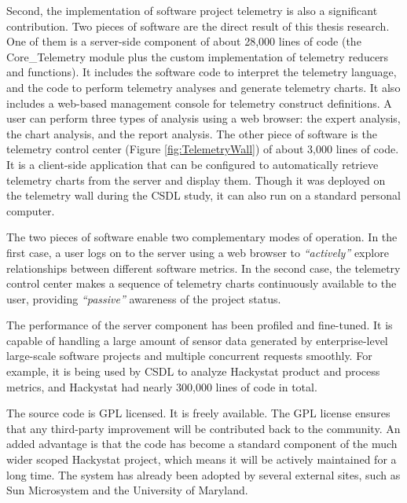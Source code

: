 Second, the implementation of software project telemetry is also a significant contribution. Two pieces of software are the direct result of this thesis research. 
One of them is a server-side component of about 28,000 lines of code (the Core\_Telemetry module plus the custom implementation of telemetry reducers and functions). It includes the software code to interpret the telemetry language, and the code to perform telemetry analyses and generate telemetry charts. It also includes a web-based management console for telemetry construct definitions. A user can perform three types of analysis using a web browser: the expert analysis, the chart analysis, and the report analysis.
The other piece of software is the telemetry control center (Figure \ref{fig:TelemetryWall}) of about 3,000 lines of code. It is a client-side application that can be configured to automatically retrieve telemetry charts from the server and display them. Though it was deployed on the telemetry wall during the CSDL study, it can also run on a standard personal computer.

The two pieces of software enable two complementary modes of operation. In the first case, a user logs on to the server using a web browser to \textit{``actively''} explore relationships between different software metrics. In the second case, the telemetry control center makes a sequence of telemetry charts continuously available to the user, providing \textit{``passive''} awareness of the project status.

The performance of the server component has been profiled and fine-tuned. It is capable of handling a large amount of sensor data generated by enterprise-level large-scale software projects and multiple concurrent requests smoothly. For example, it is being used by CSDL to analyze Hackystat product and process metrics, and Hackystat had nearly 300,000 lines of code in total.

The source code is GPL licensed. It is freely available. The GPL license ensures that any third-party improvement will be contributed back to the community. An added advantage is that the code has become a standard component of the much wider scoped Hackystat project, which means it will be actively maintained for a long time. The system has already been adopted by several external sites, such as Sun Microsystem and the University of Maryland.








